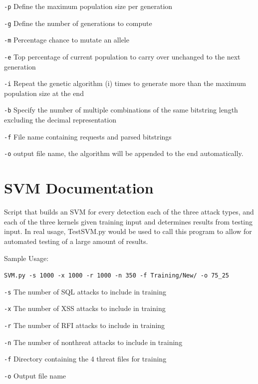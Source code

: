 \begin{appendices}
\texttt{-p} Define the maximum population size per generation

\texttt{-g} Define the number of generations to compute

\texttt{-m} Percentage chance to mutate an allele

\texttt{-e} Top percentage of current population to carry over unchanged
to the next generation

\texttt{-i} Repeat the genetic algorithm (i) times to generate more than
the maximum population size at the end

\texttt{-b} Specify the number of multiple combinations of the same
bitstring length excluding the decimal representation

\texttt{-f} File name containing requests and parsed bitstrings

\texttt{-o} output file name, the algorithm will be appended to the end
automatically.

\section{SVM Documentation} \label{app:svmDocumentation}

Script that builds an SVM for every detection each of the three attack
types, and each of the three kernels given training input and determines
results from testing input. In real usage, TestSVM.py would be used to
call this program to allow for automated testing of a large amount of
results.

Sample Usage:

\texttt{SVM.py\ -s\ 1000\ -x\ 1000\ -r\ 1000\ -n\ 350\ -f\ Training/New/\ -o\ 75\_25}

\texttt{-s} The number of SQL attacks to include in training

\texttt{-x} The number of XSS attacks to include in training

\texttt{-r} The number of RFI attacks to include in training

\texttt{-n} The number of nonthreat attacks to include in training

\texttt{-f} Directory containing the 4 threat files for training

\texttt{-o} Output file name


\end{appendices}
